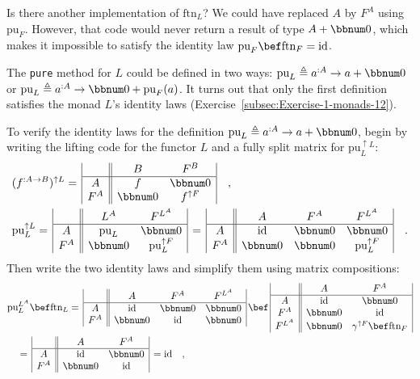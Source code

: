 Is there another implementation of $\text{ftn}_{L}$? We could have
replaced $A$ by $F^{A}$ using $\text{pu}_{F}$. However, that code
would never return a result of type $A+\bbnum 0$, which makes it
impossible to satisfy the identity law $\text{pu}_{F}\bef\text{ftn}_{F}=\text{id}$.

The \lstinline!pure! method for $L$ could be defined in two ways:
$\text{pu}_{L}\triangleq a^{:A}\rightarrow a+\bbnum 0$ or $\text{pu}_{L}\triangleq a^{:A}\rightarrow\bbnum 0+\text{pu}_{F}(a)$.
It turns out that only the first definition satisfies the monad $L$\textsf{'}s
identity laws (Exercise~\ref{subsec:Exercise-1-monads-12}).

To verify the identity laws for the definition $\text{pu}_{L}\triangleq a^{:A}\rightarrow a+\bbnum 0$,
begin by writing the lifting code for the functor $L$ and a fully
split matrix for $\text{pu}_{L}^{\uparrow L}$:
\begin{align*}
 & (f^{:A\rightarrow B})^{\uparrow L}=\,\begin{array}{|c||cc|}
 & B & F^{B}\\
\hline A & f & \bbnum 0\\
F^{A} & \bbnum 0 & f^{\uparrow F}
\end{array}\quad,\\
 & \text{pu}_{L}^{\uparrow L}=\,\begin{array}{|c||cc|}
 & L^{A} & F^{L^{A}}\\
\hline A & \text{pu}_{L} & \bbnum 0\\
F^{A} & \bbnum 0 & \text{pu}_{L}^{\uparrow F}
\end{array}\,=\,\begin{array}{|c||ccc|}
 & A & F^{A} & F^{L^{A}}\\
\hline A & \text{id} & \bbnum 0 & \bbnum 0\\
F^{A} & \bbnum 0 & \bbnum 0 & \text{pu}_{L}^{\uparrow F}
\end{array}\quad.
\end{align*}
Then write the two identity laws and simplify them using matrix compositions:
\begin{align*}
 & \text{pu}_{L}^{L^{A}}\bef\text{ftn}_{L}=\,\begin{array}{|c||ccc|}
 & A & F^{A} & F^{L^{A}}\\
\hline A & \text{id} & \bbnum 0 & \bbnum 0\\
F^{A} & \bbnum 0 & \text{id} & \bbnum 0
\end{array}\,\bef\,\begin{array}{|c||cc|}
 & A & F^{A}\\
\hline A & \text{id} & \bbnum 0\\
F^{A} & \bbnum 0 & \text{id}\\
F^{L^{A}} & \bbnum 0 & \gamma^{\uparrow F}\bef\text{ftn}_{F}
\end{array}\\
 & \quad=\,\begin{array}{|c||cc|}
 & A & F^{A}\\
\hline A & \text{id} & \bbnum 0\\
F^{A} & \bbnum 0 & \text{id}
\end{array}\,=\text{id}\quad,
\end{align*}
